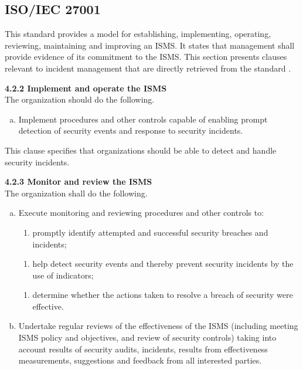 \subsection{\acs{ISO}/\acs{IEC} 27001}
\label{sec:iso27001}
This standard provides a model for establishing, implementing, operating, reviewing, maintaining and improving an \ac{ISMS}. It states that management shall provide evidence of its commitment to the ISMS. This section presents clauses relevant to incident management that are directly retrieved from the standard \cite{ISO/IEC27001}. 

\textbf{4.2.2 Implement and operate the \ac{ISMS}} \\
The organization should do the following.
\begin{enumerate}[h)]
\item Implement procedures and other controls capable of enabling prompt detection of security events and response to security incidents.
\end{enumerate}

This clause specifies that organizations should be able to detect and handle security incidents.

\textbf{4.2.3 Monitor and review the ISMS}\\
The organization shall do the following.
\begin{enumerate}[a)]
\item Execute monitoring and reviewing procedures and other controls to:
\begin{enumerate}[2)]
\item promptly identify attempted and successful security breaches and incidents;
\end{enumerate}
\vspace{-0.2cm}
\begin{enumerate}[4)]
\item help detect security events and thereby prevent security incidents by the use of indicators;
\end{enumerate}
\vspace{-0.2cm}
\begin{enumerate}[5)]
\item determine whether the actions taken to resolve a breach of security were effective.
\end{enumerate}
\item Undertake regular reviews of the effectiveness of the \ac{ISMS} (including meeting \ac{ISMS} policy and objectives, and review of security controls) taking into account results of security audits, incidents, results from effectiveness measurements, suggestions and feedback from all interested parties.
\end{enumerate}

